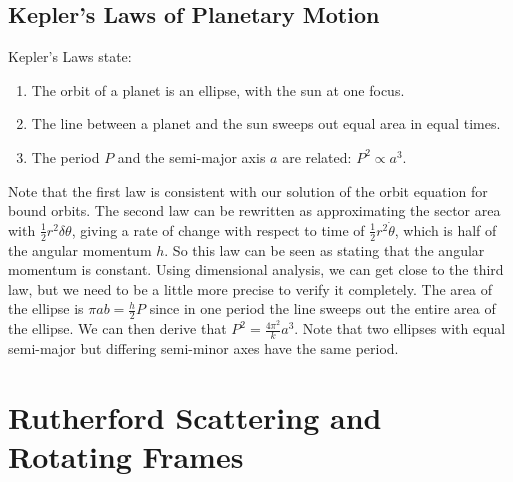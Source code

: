 \documentclass{article}
\begin{document}
\subsection{Kepler's Laws of Planetary Motion}
Kepler's Laws state:
\begin{enumerate}
	\item The orbit of a planet is an ellipse, with the sun at one focus.
	\item The line between a planet and the sun sweeps out equal area in equal times.
	\item The period $P$ and the semi-major axis $a$ are related: $P^2 \propto a^3$.
\end{enumerate}
Note that the first law is consistent with our solution of the orbit equation for bound orbits. The second law can be rewritten as approximating the sector area with $\frac{1}{2}r^2\delta\theta$, giving a rate of change with respect to time of $\frac{1}{2}r^2\dot\theta$, which is half of the angular momentum $h$. So this law can be seen as stating that the angular momentum is constant. Using dimensional analysis, we can get close to the third law, but we need to be a little more precise to verify it completely. The area of the ellipse is $\pi a b = \frac{h}{2}P$ since in one period the line sweeps out the entire area of the ellipse. We can then derive that $P^2 = \frac{4\pi^2}{k}a^3$. Note that two ellipses with equal semi-major but differing semi-minor axes have the same period.

\section{Rutherford Scattering and Rotating Frames}
\end{document}
